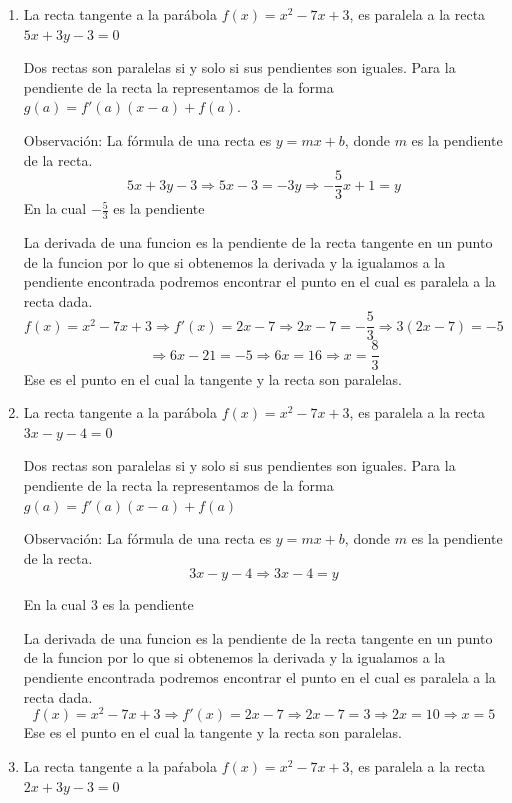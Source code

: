 \documentclass[12pt]{article}
\begin{document}
\begin{enumerate}[\hspace{9px} a)]
    \item La recta tangente a la par\'abola \(f(x)=x^2-7x+3\), es paralela a la recta \(5x+3y-3=0\)\medskip
    
    Dos rectas son paralelas si y solo si sus pendientes son iguales. Para la pendiente de la recta la representamos de la forma \(g(a) = f'(a)(x-a)+f(a)\).\medskip

    Observación: La f\'ormula de una recta es \(y=mx+b\), donde $m$ es la pendiente de la recta.
    \[5x+3y-3\Rightarrow 5x-3=-3y\Rightarrow -\displaystyle\frac{5}{3}x+1=y\]
    En la cual \(-\displaystyle\frac{5}{3}\) es la pendiente\medskip

    La derivada de una funcion es la pendiente de la recta tangente en un punto de la funcion por lo que si obtenemos la derivada y la igualamos a la pendiente encontrada podremos encontrar el punto en el cual es paralela a la recta dada.
    \[f(x)=x^2-7x+3\Rightarrow f'(x)=2x-7\Rightarrow 2x-7=-\displaystyle\frac{5}{3}\Rightarrow 3(2x-7)=-5\]
    \[\Rightarrow 6x-21=-5\Rightarrow 6x=16\Rightarrow x=\displaystyle\frac{8}{3}\]
    Ese es el punto en el cual la tangente y la recta son paralelas.\medskip

    \item La recta tangente a la par\'abola \(f(x)=x^2-7x+3\), es paralela a la recta \(3x-y-4=0\)\medskip
    
    Dos rectas son paralelas si y solo si sus pendientes son iguales. Para la pendiente de la recta la representamos de la forma \(g(a) = f'(a)(x-a)+f(a)\) \medskip

    Observación: La f\'ormula de una recta es \(y=mx+b\), donde $m$ es la pendiente de la recta.
    \[3x-y-4\Rightarrow 3x-4=y\]

    En la cual \(3\) es la pendiente\medskip

    La derivada de una funcion es la pendiente de la recta tangente en un punto de la funcion por lo que si obtenemos la derivada y la igualamos a la pendiente encontrada podremos encontrar el punto en el cual es paralela a la recta dada.
    \[f(x)=x^2-7x+3\Rightarrow f'(x)=2x-7\Rightarrow 2x-7=3\Rightarrow 2x=10\Rightarrow x=5\]
    Ese es el punto en el cual la tangente y la recta son paralelas.\medskip

    \item La recta tangente a la pa\'rabola \(f(x)=x^2-7x+3\), es paralela a la recta \(2x+3y-3=0\)\medskip
    

\end{enumerate}
\end{document}
